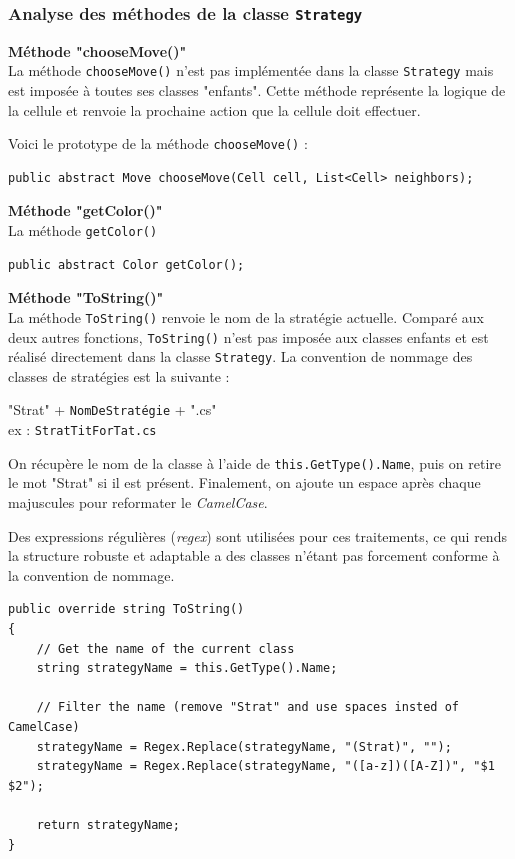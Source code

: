 \documentclass[a4paper, french]{article}
\begin{document}
\subsubsection{Analyse des méthodes de la classe \texttt{Strategy}}
\textbf{Méthode "chooseMove()"}\\
La méthode \texttt{chooseMove()} n'est pas implémentée dans la classe \texttt{Strategy} mais est imposée à toutes ses classes "enfants". Cette méthode représente la logique de la cellule et renvoie la prochaine action que la cellule doit effectuer.

Voici le prototype de la méthode \texttt{chooseMove()} :
\begin{lstlisting}
public abstract Move chooseMove(Cell cell, List<Cell> neighbors);
\end{lstlisting}

\textbf{Méthode "getColor()"}\\
La méthode \texttt{getColor()} 

\begin{lstlisting}
public abstract Color getColor();
\end{lstlisting}

\textbf{Méthode "ToString()"}\\
La méthode \texttt{ToString()} renvoie le nom de la stratégie actuelle. Comparé aux deux autres fonctions, \texttt{ToString()} n'est pas imposée aux classes enfants et est réalisé directement dans la classe \texttt{Strategy}. La convention de nommage des classes de stratégies est la suivante : 

\begin{framed}
\centering
"Strat" + \texttt{NomDeStratégie} + ".cs"\\
ex : \texttt{StratTitForTat.cs}
\end{framed}

On récupère le nom de la classe à l'aide de \texttt{this.GetType().Name}, puis on retire le mot "Strat" si il est présent. Finalement, on ajoute un espace après chaque majuscules pour reformater le \textit{CamelCase}.

Des expressions régulières (\textit{regex}) sont utilisées pour ces traitements, ce qui rends la structure robuste et adaptable a des classes n'étant pas forcement conforme à la convention de nommage.

\begin{lstlisting}
public override string ToString()
{
    // Get the name of the current class
    string strategyName = this.GetType().Name;

    // Filter the name (remove "Strat" and use spaces insted of CamelCase)
    strategyName = Regex.Replace(strategyName, "(Strat)", "");
    strategyName = Regex.Replace(strategyName, "([a-z])([A-Z])", "$1 $2");

    return strategyName;
}
\end{lstlisting}
\pagebreak
\end{document}
